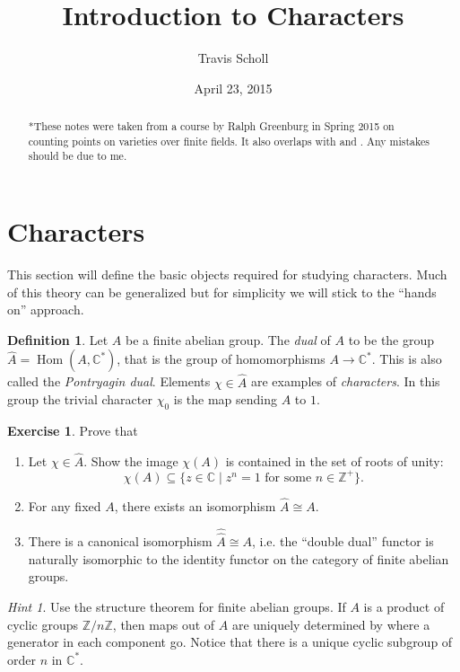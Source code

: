 \documentclass[11pt]{article}
\date{April 23, 2015}
\newcommand{\BB}[1]{\mathbb{#1}} %
\newcommand{\CC}{\BB{C}}
\newcommand{\ZZ}{\BB{Z}}
\newcommand{\st}{\mid}
\newcommand{\Hom}{\operatorname{Hom}}
\renewcommand{\hat}{\widehat}
\theoremstyle{plain}
\theoremstyle{definition}
\newtheorem{defn}[definitionCounter]{Definition}
\newtheorem{excer}[exerciseCounter]{Exercise}
\theoremstyle{remark}
\newtheorem*{hint}{Hint}
\newcommand{\mytitle}{Introduction to Characters}
\newcommand{\myauthor}{Travis Scholl}
\begin{document}
\title{\bfseries\sffamily \mytitle}
\author{\sc \myauthor }
\maketitle

\begin{abstract}
	*These notes were taken from a course by Ralph Greenburg in Spring 2015 \cite{ralphscourse} on counting points on varieties over finite fields. It also overlaps with \cite[Ch. VI]{serre2012course} and \cite{washington1997introduction}. Any mistakes should be due to me.
\end{abstract}

\section{Characters}
\hfill

This section will define the basic objects required for studying characters. Much of this theory can be generalized but for simplicity we will stick to the ``hands on'' approach.

\begin{defn}
	Let $A$ be a finite abelian group. The \emph{dual} of $A$ to be the group $\hat{A} = \Hom(A,\CC^*)$, that is the group of homomorphisms $A \to \CC^*$. This is also called the \emph{Pontryagin dual}. Elements $\chi\in\hat{A}$ are examples of \emph{characters}. In this group the trivial character $\chi_0$ is the map sending $A$ to $1$.
\end{defn}

\begin{excer}\label{ex:charbasics}
	Prove that
	\begin{enumerate}[label=(\alph*)]
		\item Let $\chi\in\hat{A}$. Show the image $\chi(A)$ is contained in the set of roots of unity:
		$$
			\chi(A) \subseteq \{z\in\CC \st z^n=1 \text{ for some $n\in\ZZ^+$}\}.
		$$
		\item For any fixed $A$, there exists an isomorphism $\hat{A} \cong A$.
		\item There is a canonical isomorphism $\hat{\hat{A}} \cong A$, i.e. the ``double dual'' functor is naturally isomorphic to the identity functor on the category of finite abelian groups.
	\end{enumerate}
	\begin{hint}
		Use the structure theorem for finite abelian groups. If $A$ is a product of cyclic groups $\ZZ/n\ZZ$, then maps out of $A$ are uniquely determined by where a generator in each component go. Notice that there is a unique cyclic subgroup of order $n$ in $\CC^*$.
	\end{hint}
\end{excer}
\end{document}
